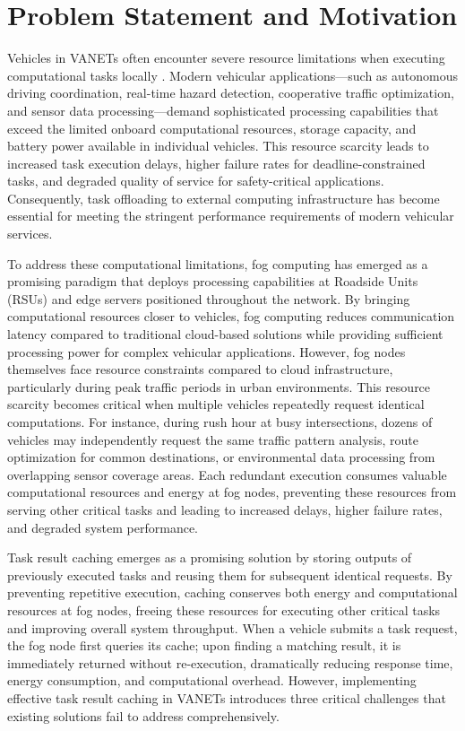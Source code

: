 \section{Problem Statement and Motivation}

Vehicles in VANETs often encounter severe resource limitations when executing computational tasks locally \cite{wu2021design}. Modern vehicular applications—such as autonomous driving coordination, real-time hazard detection, cooperative traffic optimization, and sensor data processing—demand sophisticated processing capabilities that exceed the limited onboard computational resources, storage capacity, and battery power available in individual vehicles. This resource scarcity leads to increased task execution delays, higher failure rates for deadline-constrained tasks, and degraded quality of service for safety-critical applications. Consequently, task offloading to external computing infrastructure has become essential for meeting the stringent performance requirements of modern vehicular services.

To address these computational limitations, fog computing has emerged as a promising paradigm that deploys processing capabilities at Roadside Units (RSUs) and edge servers positioned throughout the network. By bringing computational resources closer to vehicles, fog computing reduces communication latency compared to traditional cloud-based solutions while providing sufficient processing power for complex vehicular applications. However, fog nodes themselves face resource constraints compared to cloud infrastructure, particularly during peak traffic periods in urban environments. This resource scarcity becomes critical when multiple vehicles repeatedly request identical computations. For instance, during rush hour at busy intersections, dozens of vehicles may independently request the same traffic pattern analysis, route optimization for common destinations, or environmental data processing from overlapping sensor coverage areas. Each redundant execution consumes valuable computational resources and energy at fog nodes, preventing these resources from serving other critical tasks and leading to increased delays, higher failure rates, and degraded system performance.

Task result caching emerges as a promising solution by storing outputs of previously executed tasks and reusing them for subsequent identical requests. By preventing repetitive execution, caching conserves both energy and computational resources at fog nodes, freeing these resources for executing other critical tasks and improving overall system throughput. When a vehicle submits a task request, the fog node first queries its cache; upon finding a matching result, it is immediately returned without re-execution, dramatically reducing response time, energy consumption, and computational overhead. However, implementing effective task result caching in VANETs introduces three critical challenges that existing solutions fail to address comprehensively.

